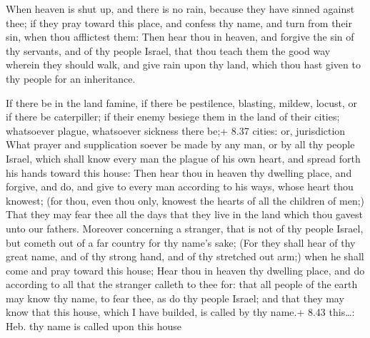  When heaven is shut up, and there is no rain, because
they have sinned against thee; if they pray toward this place, and
confess thy name, and turn from their sin, when thou afflictest them:
 Then hear thou in heaven, and forgive the sin of thy
servants, and of thy people Israel, that thou teach them the good way
wherein they should walk, and give rain upon thy land, which thou hast
given to thy people for an inheritance.

 If there be in the land famine, if there be pestilence,
blasting, mildew, locust, or if there be caterpiller; if their enemy
besiege them in the land of their cities; whatsoever plague, whatsoever
sickness there be;+ 8.37 cities: or, jurisdiction  What
prayer and supplication soever be made by any man, or by all thy people
Israel, which shall know every man the plague of his own heart, and
spread forth his hands toward this house:  Then hear thou
in heaven thy dwelling place, and forgive, and do, and give to every man
according to his ways, whose heart thou knowest; (for thou, even thou
only, knowest the hearts of all the children of men;)  That
they may fear thee all the days that they live in the land which thou
gavest unto our fathers.  Moreover concerning a stranger,
that is not of thy people Israel, but cometh out of a far country for
thy name's sake;  (For they shall hear of thy great name,
and of thy strong hand, and of thy stretched out arm;) when he shall
come and pray toward this house;  Hear thou in heaven thy
dwelling place, and do according to all that the stranger calleth to
thee for: that all people of the earth may know thy name, to fear thee,
as do thy people Israel; and that they may know that this house, which I
have builded, is called by thy name.+ 8.43 this\ldots: Heb. thy name is
called upon this house

